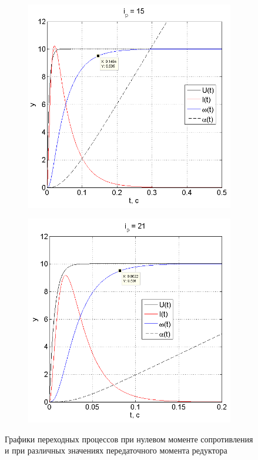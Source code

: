 \documentclass[fleqn, a4paper, 11pt, russian]{article}
\begin{document}
	\begin{figure}[ht!]\ContinuedFloat
		\centering
		\begin{subfigure}[b]{0.49\textwidth}
			\includegraphics[width = \textwidth]{M0i15}
		\end{subfigure}
		\hfill
		\begin{subfigure}[b]{0.49\textwidth}
			\includegraphics[width = \textwidth]{M0i21}
		\end{subfigure}
		\caption{Графики переходных процессов при нулевом моменте сопротивления и при различных значениях передаточного момента редуктора}
		\label{M0ivar}
	\end{figure}
	
\end{document}
